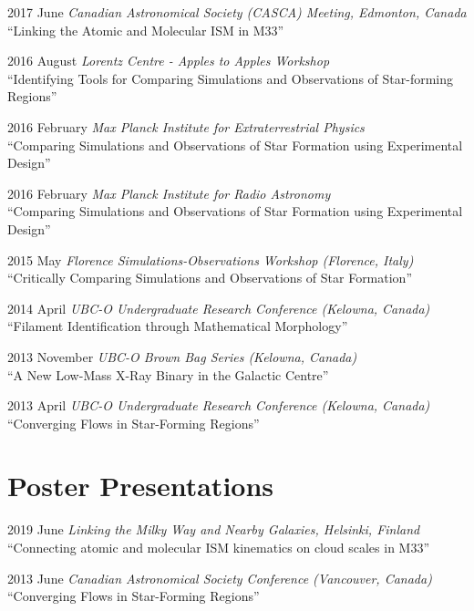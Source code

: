 \documentclass[letterpaper,11pt]{article}
\newlength{\mainindent} \setlength{\mainindent}{12pt}
\newlength{\contentindent} \setlength{\contentindent}{19ex}
\newenvironment{datelist}{
  \begingroup
  \raggedright
  \begin{description}[labelindent=\mainindent,leftmargin=\contentindent,
      style=sameline,font=\normalfont,topsep=0pt,partopsep=0pt,parsep=0pt,
      itemsep=4pt]
}{
  \end{description}
  \endgroup
}
\begin{document}
\begin{datelist}
\item[2017 June] \emph{Canadian Astronomical Society (CASCA) Meeting, Edmonton, Canada} \\ ``Linking the Atomic and Molecular ISM in M33''
\item[2016 August] \emph{Lorentz Centre - Apples to Apples Workshop} \\ ``Identifying Tools for Comparing Simulations and Observations of Star-forming Regions''
\item[2016 February] \emph{Max Planck Institute for Extraterrestrial Physics} \\ ``Comparing Simulations and Observations of Star Formation using Experimental Design''
\item[2016 February] \emph{Max Planck Institute for Radio Astronomy} \\ ``Comparing Simulations and Observations of Star Formation using Experimental Design''
\item[2015 May] \emph{Florence Simulations-Observations Workshop (Florence, Italy)} \\ ``Critically Comparing Simulations and Observations of Star Formation''
\item[2014 April] \emph{UBC-O Undergraduate Research Conference (Kelowna, Canada)} \\ ``Filament Identification through Mathematical Morphology''
\item[2013 November] \emph{UBC-O Brown Bag Series (Kelowna, Canada)} \\ ``A New Low-Mass X-Ray Binary in the Galactic Centre''
\item[2013 April] \emph{UBC-O Undergraduate Research Conference (Kelowna, Canada)} \\ ``Converging Flows in Star-Forming Regions''
\end{datelist}

\section*{Poster Presentations}
\begin{datelist}
\item[2019 June] \emph{Linking the Milky Way and Nearby Galaxies, Helsinki, Finland} \\ ``Connecting atomic and molecular ISM kinematics on cloud scales in M33''
\item[2013 June] \emph{Canadian Astronomical Society Conference (Vancouver, Canada)} \\ ``Converging Flows in Star-Forming Regions''
\end{datelist}
\end{document}
